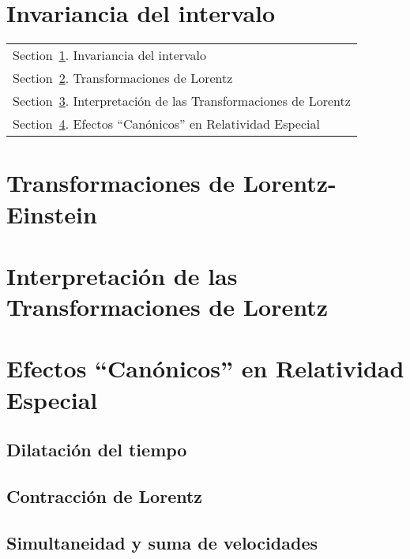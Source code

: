 \documentclass[../main]{subfiles}
\begin{document}
\section{Invariancia del intervalo}\label{sec:InvIntervalo}
	\begin{margintable}\vspace{1.4in}\footnotesize
		\begin{tabularx}{\marginparwidth}{|X}
		Section~\ref{sec:InvIntervalo}. Invariancia del intervalo\\
        Section~\ref{sec:TransLorentz}. Transformaciones de Lorentz\\
        Section~\ref{Sec:IntLorentz}. Interpretación de las Transformaciones de Lorentz\\
        Section~\ref{Sec:EfectosCanonicos}. Efectos ``Canónicos'' en Relatividad Especial\\
		\end{tabularx}
    \end{margintable}
	\lipsum[1]

    \begin{adjustwidth}{0pt}{-100pt}
    
	\section{Transformaciones de Lorentz-Einstein} \label{sec:TransLorentz}
            \lipsum[1]

	\section{Interpretación de las Transformaciones de Lorentz}\label{Sec:IntLorentz}
	       \lipsum[1]
	

	\section{Efectos ``Canónicos'' en Relatividad Especial}\label{Sec:EfectosCanonicos}
            \lipsum[1]

        \subsection{Dilatación del tiempo}
            \lipsum[1]

        \subsection{Contracción de Lorentz}
            \lipsum[1]

        \subsection{Simultaneidad y suma de velocidades}
            \lipsum[1]
    \end{adjustwidth}
\end{document}
